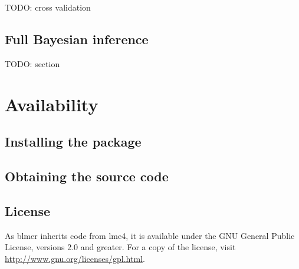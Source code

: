 \documentclass[10pt]{article}
\newcommand{\pkg}[1]{{\fontseries{b}\selectfont #1}}
\begin{document}
TODO: cross validation

\subsection{Full Bayesian inference}

TODO: section

\section{Availability}

\subsection{Installing the package}

\subsection{Obtaining the source code}

\subsection{License}

As \pkg{blmer} inherits code from \pkg{lme4}, it is available under
the GNU General Public License, versions 2.0 and greater. For a copy
of the license, visit \url{http://www.gnu.org/licenses/gpl.html}.



\end{document}
